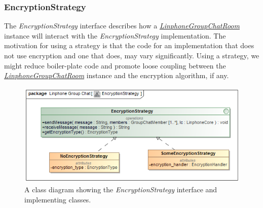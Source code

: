 \documentclass[11pt]{article}
\begin{document}
\subsubsection{EncryptionStrategy}
The \textit{EncryptionStrategy} interface describes how a \textit{ \hyperref[subsubsec: linphonegroupchatroom]{LinphoneGroupChatRoom}} instance will interact with the \textit{EncryptionStrategy} implementation. The motivation for using a strategy is that the code for an implementation that does not use encryption and one that does, may vary significantly. Using a strategy, we might reduce boiler-plate code and promote loose coupling between the \textit{ \hyperref[subsubsec: linphonegroupchatroom]{LinphoneGroupChatRoom}} instance and the encryption algorithm, if any.
\begin{figure}[H]
\centering
\includegraphics[width=5in]{./images/class_encryption_strategy.png}
\caption[EncryptionStrategy Class Diagram]{A class diagram showing the \textit{EncryptionStrategy} interface and implementing classes.}
\label{cd-encryption-strategy}
\end{figure}
\end{document}

